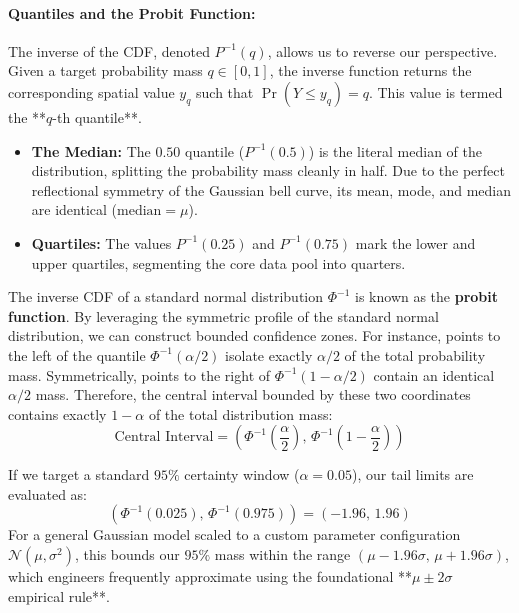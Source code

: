 \documentclass{article}
\begin{document}
\paragraph{Quantiles and the Probit Function:}
The inverse of the CDF, denoted $P^{-1}(q)$, allows us to reverse our perspective. Given a target probability mass $q \in [0, 1]$, the inverse function returns the corresponding spatial value $y_q$ such that $\Pr(Y \le y_q) = q$. This value is termed the **$q$-th quantile**.
\begin{itemize}
    \item \textbf{The Median:} The $0.50$ quantile ($P^{-1}(0.5)$) is the literal median of the distribution, splitting the probability mass cleanly in half. Due to the perfect reflectional symmetry of the Gaussian bell curve, its mean, mode, and median are identical ($\text{median} = \mu$).
    \item \textbf{Quartiles:} The values $P^{-1}(0.25)$ and $P^{-1}(0.75)$ mark the lower and upper quartiles, segmenting the core data pool into quarters.
\end{itemize}

The inverse CDF of a standard normal distribution $\Phi^{-1}$ is known as the \textbf{probit function}. By leveraging the symmetric profile of the standard normal distribution, we can construct bounded confidence zones. For instance, points to the left of the quantile $\Phi^{-1}(\alpha/2)$ isolate exactly $\alpha/2$ of the total probability mass. Symmetrically, points to the right of $\Phi^{-1}(1 - \alpha/2)$ contain an identical $\alpha/2$ mass. Therefore, the central interval bounded by these two coordinates contains exactly $1 - \alpha$ of the total distribution mass:
\begin{equation}
    \text{Central Interval} = \left( \Phi^{-1}\left(\frac{\alpha}{2}\right), \, \Phi^{-1}\left(1 - \frac{\alpha}{2}\right) \right)
\end{equation}

If we target a standard $95\%$ certainty window ($\alpha = 0.05$), our tail limits are evaluated as:
\begin{equation}
    \left( \Phi^{-1}(0.025), \, \Phi^{-1}(0.975) \right) = (-1.96, \, 1.96)
\end{equation}
For a general Gaussian model scaled to a custom parameter configuration $\mathcal{N}(\mu, \sigma^2)$, this bounds our $95\%$ mass within the range $(\mu - 1.96\sigma, \, \mu + 1.96\sigma)$, which engineers frequently approximate using the foundational **$\mu \pm 2\sigma$ empirical rule**.
\end{document}
